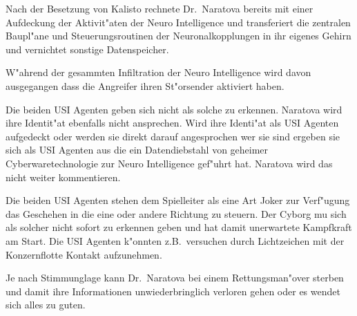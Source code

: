 \begin{remarks}
Nach der Besetzung von Kalisto rechnete Dr.~Naratova bereits mit einer Aufdeckung der Aktivit"aten der Neuro Intelligence und transferiert die zentralen Baupl"ane und Steuerungsroutinen der Neuronalkopplungen in ihr eigenes Gehirn und vernichtet sonstige Datenspeicher.

W"ahrend der gesammten Infiltration der Neuro Intelligence wird davon ausgegangen dass die Angreifer ihren St"orsender aktiviert haben.

Die beiden USI Agenten geben sich nicht als solche zu erkennen. Naratova wird ihre Identit"at ebenfalls nicht ansprechen. Wird ihre Identi"at als USI Agenten aufgedeckt oder werden sie direkt darauf angesprochen wer sie sind ergeben sie sich als USI Agenten aus die ein Datendiebstahl von geheimer Cyberwaretechnologie zur Neuro Intelligence gef"uhrt hat. Naratova wird das nicht weiter kommentieren.

Die beiden USI Agenten stehen dem Spielleiter als eine Art Joker zur Verf"ugung das Geschehen in die eine oder andere Richtung zu steuern. Der Cyborg mu\3 sich als solcher nicht sofort zu erkennen geben und hat damit unerwartete Kampfkraft am Start. Die USI Agenten k"onnten z.B.~versuchen durch Lichtzeichen mit der Konzernflotte Kontakt aufzunehmen.

Je nach Stimmunglage kann Dr.~Naratova bei einem Rettungsman"over sterben und damit ihre Informationen unwiederbringlich verloren gehen oder es wendet sich alles zu guten.
\end{remarks}